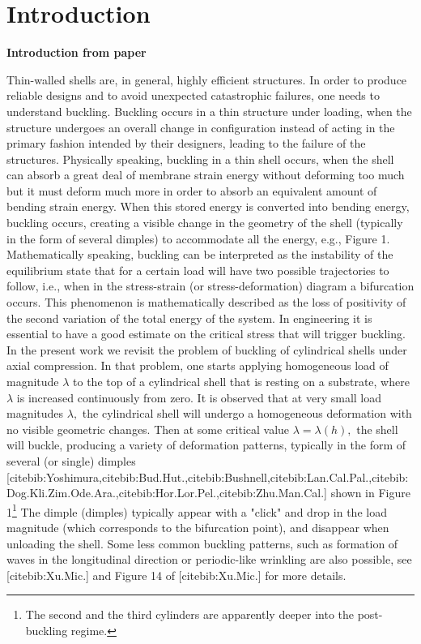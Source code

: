\chapter{Introduction}
\label{chap:intro}

\textbf{Introduction from paper}

Thin-walled shells are, in general, highly efficient structures. In order to produce reliable designs and to avoid unexpected catastrophic failures, one needs to understand buckling. Buckling occurs in a thin structure under loading, when the structure undergoes an overall change in configuration instead of acting in the primary fashion intended by their designers, leading to the failure of the structures. Physically speaking, buckling in a thin shell occurs, when the shell can absorb a great deal of membrane strain energy without deforming too much but it must deform much more in order to absorb an equivalent amount of bending strain energy. When this stored energy is converted into bending energy, buckling occurs, creating a visible change in the geometry of the shell (typically in the form of several dimples) to accommodate all the energy, e.g., Figure 1. Mathematically speaking, buckling can be interpreted as the instability of the equilibrium state that for a certain load will have two possible trajectories to follow, i.e., when in the stress-strain (or stress-deformation) diagram a bifurcation occurs. This phenomenon is mathematically described as the loss of positivity of the second variation of the total energy of the system. In engineering it is essential to have a good estimate on the critical stress that will trigger buckling. In the present work we revisit the problem of buckling of cylindrical shells under axial compression. In that problem, one starts applying homogeneous load of magnitude $\lambda$ to the top of a cylindrical shell that is resting on a substrate, where $\lambda$ is increased continuously from zero. It is observed that at very small load magnitudes $\lambda,$ the cylindrical shell will undergo a homogeneous deformation with no visible geometric changes. Then at some critical value $\lambda=\lambda(h),$ the shell will buckle, producing a variety of deformation patterns, typically in the form of several (or single) dimples 
[cite{bib:Yoshimura},cite{bib:Bud.Hut.},cite{bib:Bushnell},cite{bib:Lan.Cal.Pal.},cite{bib:Dog.Kli.Zim.Ode.Ara.},cite{bib:Hor.Lor.Pel.},cite{bib:Zhu.Man.Cal.}] 
shown in Figure 1\footnote{The second and the third cylinders are apparently deeper into the post-buckling regime.} The dimple (dimples) typically appear with a "click" and drop in the load magnitude (which corresponds to the bifurcation point), and disappear when unloading the shell. Some less common buckling patterns, such as formation of waves in the longitudinal direction or periodic-like wrinkling are also possible, see [cite{bib:Xu.Mic.}] and Figure 14  of [cite{bib:Xu.Mic.}] for more details.
